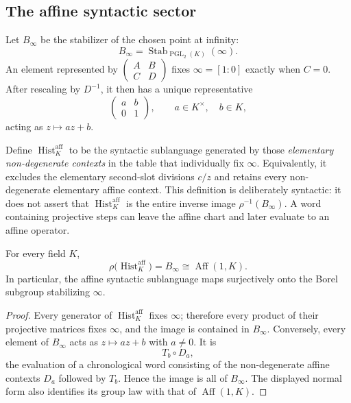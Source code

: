 \subsection{The affine syntactic sector}

Let $B_\infty$ be the stabilizer of the chosen point at infinity:
\[
  B_\infty
  =\operatorname{Stab}_{\operatorname{PGL}_2(K)}(\infty).
\]
An element represented by $\begin{pmatrix}A&B\\C&D\end{pmatrix}$ fixes
$\infty=[1:0]$ exactly when $C=0$.  After rescaling by $D^{-1}$, it then has a
unique representative
\[
  \begin{pmatrix}a&b\\0&1\end{pmatrix},
  \qquad a\in K^\times,\quad b\in K,
\]
acting as $z\mapsto az+b$.

Define $\operatorname{Hist}^{\mathrm{aff}}_K$ to be the syntactic sublanguage
generated by those \emph{elementary non-degenerate contexts} in the table that
individually fix $\infty$.  Equivalently, it excludes the elementary
second-slot divisions $c/z$ and retains every non-degenerate elementary affine
context.  This definition is deliberately syntactic: it does not assert that
$\operatorname{Hist}^{\mathrm{aff}}_K$ is the entire inverse image
$\rho^{-1}(B_\infty)$.  A word containing projective steps can leave the
affine chart and later evaluate to an affine operator.

\begin{corollary}
\label{cor:affine-borel-sector}
For every field $K$,
\[
  \rho\bigl(\operatorname{Hist}^{\mathrm{aff}}_K\bigr)=B_\infty
  \cong\operatorname{Aff}(1,K).
\]
In particular, the affine syntactic sublanguage maps surjectively onto the
Borel subgroup stabilizing $\infty$.
\end{corollary}

\begin{proof}
Every generator of $\operatorname{Hist}^{\mathrm{aff}}_K$ fixes $\infty$;
therefore every product of their projective matrices fixes $\infty$, and the
image is contained in $B_\infty$.  Conversely, every element of $B_\infty$
acts as $z\mapsto az+b$ with $a\ne0$.  It is
\[
  T_b\circ D_a,
\]
the evaluation of a chronological word consisting of the non-degenerate
affine contexts $D_a$ followed by $T_b$.  Hence the image is all of
$B_\infty$.  The displayed normal form also identifies its group law with
that of $\operatorname{Aff}(1,K)$.
\end{proof}


